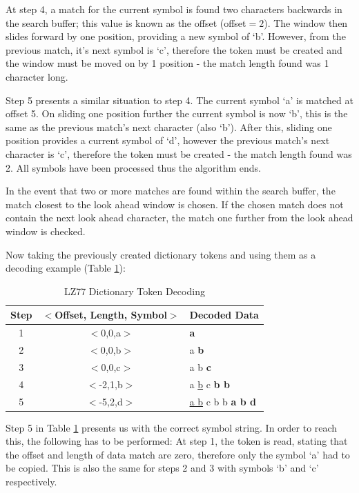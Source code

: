 \documentclass[12pt]{article}
\begin{document}
At step 4, a match for the current symbol is found two characters backwards in the search buffer; this value is known as the offset (offset$=2$). The window then slides forward by one position, providing a new symbol of `b'. However, from the previous match, it's next symbol is `c', therefore the token must be created and the window must be moved on by 1 position - the match length found was 1 character long.

Step 5 presents a similar situation to step 4. The current symbol `a' is matched at offset 5. On sliding one position further the current symbol is now `b', this is the same as the previous match's next character (also `b'). After this, sliding one position provides a current symbol of `d', however the previous match's next character is `c', therefore the token must be created - the match length found was 2. All symbols have been processed thus the algorithm ends. 

In the event that two or more matches are found within the search buffer, the match closest to the look ahead window is chosen. If the chosen match does not contain the next look ahead character, the match one further from the look ahead window is checked.

Now taking the previously created dictionary tokens and using them as a decoding example (Table \ref{dic_code_decode}):

\begin{table}[H]
	\centering
	\begin{tabular}{| c | c | l |} 
		\hline
		Step & $<$Offset, Length, Symbol$>$ & Decoded Data\\
		\hline
		1 & $<$0,0,a$>$ & \textbf{a} \\
		2 & $<$0,0,b$>$ & a\textbf{ b} \\
		3 & $<$0,0,c$>$ & a b\textbf{ c} \\
		4 & $<$-2,1,b$>$ & a \underline{b} c\textbf{ b b}\\
		5 & $<$-5,2,d$>$ & \underline{a b} c b b\textbf{ a b d}\\
		\hline
	\end{tabular}
	\caption{LZ77 Dictionary Token Decoding}
	\label{dic_code_decode}
\end{table}

Step 5 in Table \ref{dic_code_decode} presents us with the correct symbol string. In order to reach this, the following has to be performed: At step 1, the token is read, stating that the offset and length of data match are zero, therefore only the symbol `a' had to be copied. This is also the same for steps 2 and 3 with symbols `b' and `c' respectively.
\end{document}
